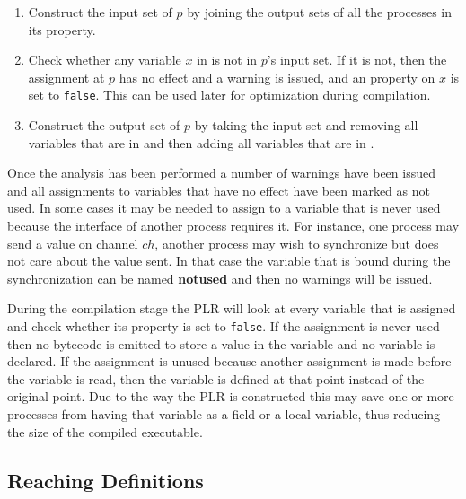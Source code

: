   	\begin{enumerate}
  		\item Construct the input set of $p$ by joining the output sets of all 
  		the processes in its  property.

  		\item Check whether any variable $x$ in  is 
  		not in $p$'s input set. If it is not, then the assignment at $p$ has no 
  		effect and a warning is issued, and an  property on $x$ 
  		is set to \texttt{false}. This can be used later for optimization during 
  		compilation.
  		
  		\item Construct the output set of $p$ by taking the input set and 
  		removing all variables that are in  and then 
  		adding all variables that are in .
  	
  	\end{enumerate}
  
  Once the analysis has been performed a number of warnings have been issued 
  and all assignments to variables that have no effect have been marked as not 
  used. In some cases it may be needed to assign to a variable that is never 
  used because the interface of another process requires it. For instance, one 
  process may send a value on channel $ch$, another process may wish to 
  synchronize but does not care about the value sent. In that case the 
  variable that is bound during the synchronization can be named 
  \textbf{notused} and then no warnings will be issued.
  
  During the compilation stage the PLR will look at every variable that is 
  assigned and check whether its  property is set to 
  \texttt{false}. If the assignment is never used then no bytecode is emitted
  to store a value in the variable and no variable is declared. If the 
  assignment is unused because another assignment is made before the variable 
  is read, then the variable is defined at that point instead of the original 
  point. Due to the way the PLR is constructed this may save one or more
  processes from having that variable as a field or a local variable, thus
  reducing the size of the compiled executable.

\subsection{Reaching Definitions}\label{reaching_definitions}

